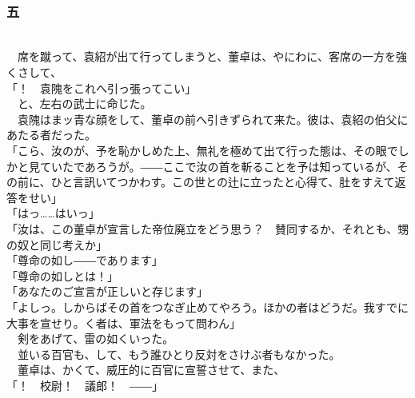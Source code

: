 \documentclass[
  paper=a5,
  fontsize=10pt,
  jafontsize=9.5pt,
  tate,                  %
  open_bracket_pos=nibu, %
]{jlreq}
\begin{document}
\\

\subsubsection{五}

\\


　席を蹴って、袁紹が出て行ってしまうと、董卓は、やにわに、客席の一方を強くさして、\\


「！　袁隗をこれへ引っ張ってこい」\\


　と、左右の武士に命じた。\\


　袁隗はまッ青な顔をして、董卓の前へ引きずられて来た。彼は、袁紹の伯父にあたる者だった。\\


「こら、汝のが、予を恥かしめた上、無礼を極めて出て行った態は、その眼でしかと見ていたであろうが。――ここで汝の首を斬ることを予は知っているが、その前に、ひと言訊いてつかわす。この世との辻に立ったと心得て、肚をすえて返答をせい」\\


「はっ……はいっ」\\


「汝は、この董卓が宣言した帝位廃立をどう思う？　賛同するか、それとも、甥の奴と同じ考えか」\\


「尊命の如し――であります」\\


「尊命の如しとは！」\\


「あなたのご宣言が正しいと存じます」\\


「よしっ。しからばその首をつなぎ止めてやろう。ほかの者はどうだ。我すでに大事を宣せり。く者は、軍法をもって問わん」\\


　剣をあげて、雷の如くいった。\\


　並いる百官も、して、もう誰ひとり反対をさけぶ者もなかった。\\


　董卓は、かくて、威圧的に百官に宣誓させて、また、\\


「！　校尉！　議郎！　――」\\
\end{document}
